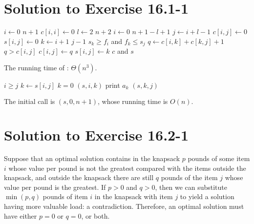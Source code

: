 \documentclass[fleqn]{article}
\begin{document}
\section*{Solution to Exercise 16.1-1}

\begin{codebox}
\li \For $i \gets 0$ \To $n+1$
\li   \Do
        $c[i,i] \gets 0$
      \End
\li \For $l \gets 2$ \To $n+2$
\li   \Do
        \For $i \gets 0$ \To $n+1-l+1$
\li       \Do
            $j \gets i+l-1$
\li         $c[i,j] \gets 0$
\li         $s[i,j] \gets 0$
\li         \For $k \gets i+1$ \To $j-1$
\li           \Do
                \If $s_k \geq f_i$ and $f_k \leq s_j$
\li               \Then
                    $q \gets c[i,k] + c[k,j] + 1$
\li                 \If $q > c[i,j]$
\li                   \Then
                        $c[i,j] \gets q$
\li                     $s[i,j] \gets k$
                      \End  %
\li               \End  %
              \End  %
          \End  %
      \End  %
\li \Return $c$ and $s$
\end{codebox}

The running time of : $\Theta(n^3)$.

\begin{codebox}
\li \If $i \geq j$
\li   \Then
        \Return
      \End
\li $k \gets s[i,j]$
\li \If $k = 0$
\li   \Then
        \Return
      \End
\li {}$(s,i,k)$
\li print $a_k$
\li {}$(s,k,j)$
\end{codebox}

The initial call is $(s,0,n+1)$, whose
running time is $O(n)$.







\section*{Solution to Exercise 16.2-1}

Suppose that an optimal solution contains in the knapsack $p$ pounds
of some item $i$ whose value per pound is not the greatest compared
with the items outside the knapsack, and outside the knapsack there
are still $q$ pounds of the item $j$ whose value per pound is the
greatest. If $p > 0$ and $q > 0$, then we can substitute $\min(p,q)$
pounds of item $i$ in the knapsack with item $j$ to yield a solution
having more valuable load: a contradiction.  Therefore, an optimal
solution must have either $p = 0$ or $q = 0$, or both.
\end{document}
